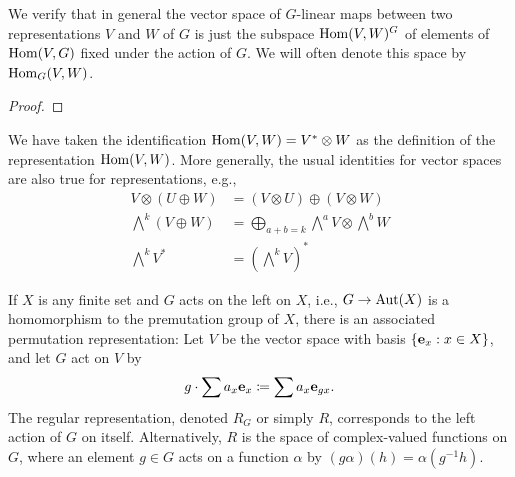 \begin{exercise}
We verify that in general the vector space of $G$-linear maps between two
representations $V$ and $W$ of $G$ is just the subspace $\operatorname{Hom}(V,W)^G$ of
elements of $\operatorname{Hom}(V,G)$ fixed under the action of $G$. We will often denote
this space by $\operatorname{Hom}_G(V,W)$.
\end{exercise}
\begin{proof}
\end{proof}

We have taken the identification $\operatorname{Hom}(V,W)=V^*\otimes W$ as the
definition of the representation $\operatorname{Hom}(V,W)$. More generally, the usual
identities for vector spaces are also true for representations, e.g.,
\begin{align*}
V\otimes(U\oplus W)&=(V\otimes U)\oplus(V\otimes W)\\
\bigwedge^k(V\oplus W)&=\bigoplus_{a+b=k}{\textstyle\bigwedge^a V\otimes\bigwedge^b
  W}\\
{\textstyle\bigwedge^k V^*}&=\left({\textstyle{\bigwedge^kV}}\right)^*
\end{align*}

If $X$ is any finite set and $G$ acts on the left on $X$, i.e.,
$G\to\operatorname{Aut}(X)$ is a homomorphism to the premutation group of $X$, there is
an associated permutation representation: Let $V$ be the vector space with
basis $\{\mathbf{e}_x:x\in X\}$, and let $G$ act on $V$ by
\[
  g\cdot\sum a_x\mathbf{e}_x\coloneqq\sum a_x\mathbf{e}_{gx}.
\]
The regular representation, denoted $R_G$ or simply $R$, corresponds to the
left action of $G$ on itself. Alternatively, $R$ is the space of
complex-valued functions on $G$, where an element $g\in G$ acts on a
function $\alpha$ by $(g\alpha)(h)=\alpha(g^{-1}h)$.

